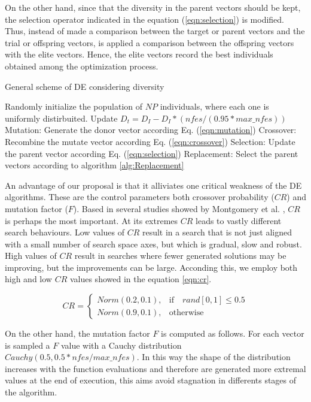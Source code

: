 On the other hand, since that the diversity in the parent vectors should be kept, the selection operator indicated in the equation (\ref{eqn:selection}) is modified.
%
Thus, instead of made a comparison between the target or parent vectors and the trial or offspring vectors, is applied a comparison between the offspring vectors with the elite vectors.
%
Hence, the elite vectors record the best individuals obtained among the optimization process.
%


\begin{algorithm}[H]
  \scriptsize
	\caption{General scheme of DE considering diversity} 
	\begin{algorithmic}[1]
	\STATE Randomly initialize the population of $NP$ individuals, where each one is uniformly distirbuited.
	\STATE Update $D_t = D_I - D_I *(nfes/(0.95*max\_nfes)) $ 
		\STATE Mutation: Generate the donor vector according Eq. (\ref{eqn:mutation})
		\STATE Crossover: Recombine the mutate vector according Eq. (\ref{eqn:crossover})
		\STATE Selection: Update the parent vector according  Eq. (\ref{eqn:selection})
		\STATE Replacement: Select the parent vectors according to algorithm \ref{alg:Replacement}
	   \ENDFOR
	\ENDWHILE
    \label{alg:Fase_Remplazo_VSD-MOEAD}
\end{algorithmic}
\end{algorithm}


An advantage of our proposal is that it alliviates one critical weakness of the DE algorithms.
%
These are the control parameters both crossover probability ($CR$) and mutation factor ($F$).
%
Based in several studies showed by Montgomery et al. \cite{montgomery2010analysis}, $CR$ is perhaps the most important.
%
At its extremes $CR$ leads to vastly different search behaviours.
%
Low values of $CR$ result in a search that is not just aligned with a small number of search space axes, but which is gradual, slow and robust.
%
High values of $CR$ result in searches where fewer generated solutions may be improving, but the improvements can be large.
%
Acconding this, we employ both high and low $CR$ values showed in the equation \ref{eqn:cr}.

\begin{equation} \label{eqn:cr}
CR = 
\begin{cases}
     Norm(0.2, 0.1),& \text{if} \quad rand[0,1] \leq 0.5  \\
     Norm(0.9, 0.1),              & \text{otherwise}
\end{cases}
\end{equation}


On the other hand, the mutation factor $F$ is computed as follows.
%
For each vector is sampled a $F$ value with a Cauchy distribution $Cauchy(0.5, 0.5*nfes/max\_nfes)$.
%
In this way the shape of the distribution increases with the function evaluations and therefore are generated more extremal values at the end of execution, this aims avoid stagnation in differents stages of the algorithm.
%
